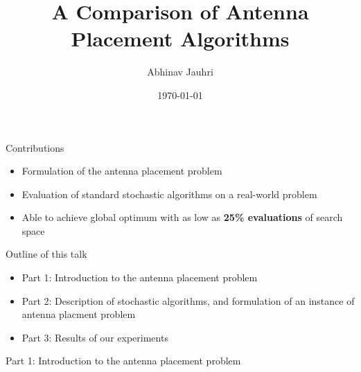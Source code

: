 \documentclass{beamer}
\title{\color{univred} A Comparison of Antenna Placement Algorithms}
\author{Abhinav Jauhri}
\date{\today}
\begin{document}
\begin{frame}
    \color{univred}
    \titlepage
\end{frame}

\begin{frame}[t]{Contributions}
    \begin{itemize}
        \item Formulation of the antenna placement problem
        \item Evaluation of standard stochastic algorithms on a real-world problem
        \item Able to achieve global optimum with as low as \textbf{25\% evaluations} of search space
    \end{itemize}
    \vspace{5mm}
\end{frame}


\begin{frame}{Outline of this talk}
    \begin{itemize}
        \setlength\itemsep{2em}
        \item Part 1: Introduction to the antenna placement problem
        \item Part 2: Description of stochastic algorithms, and formulation of an instance of antenna placment problem
        \item Part 3: Results of our experiments
    \end{itemize}
\end{frame}

\begin{frame}{\null}
    \begin{tcolorbox}[colback=green!5]
        \centering\Huge
        Part 1: Introduction to the antenna placement problem
    \end{tcolorbox}
\end{frame}
\end{document}
